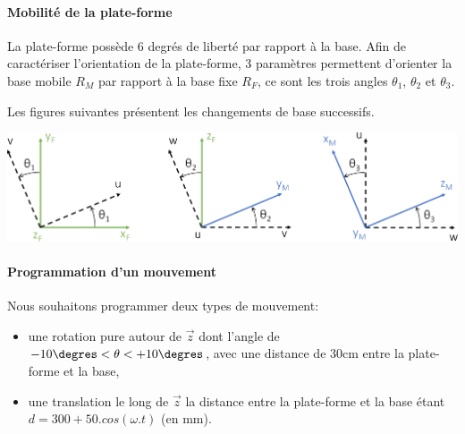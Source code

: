 
\paragraph{Mobilité de la plate-forme}

La plate-forme possède 6 degrés de liberté par rapport à la base. Afin de caractériser l'orientation de la plate-forme, 3 paramètres permettent d'orienter la base mobile $R_M$ par rapport à la base fixe $R_F$, ce sont les trois angles $\theta_1$, $\theta_2$ et $\theta_3$.

Les figures suivantes présentent les changements de base successifs.

\begin{center}
 \includegraphics[width=0.8\linewidth]{img/Stewart_euler}
\end{center}



\paragraph{Programmation d'un mouvement}

Nous souhaitons programmer deux types de mouvement:
\begin{itemize}
 \item une rotation pure autour de $\overrightarrow{z}$ dont l'angle de $-10\degres<\theta<+10\degres$, avec une distance de 30cm entre la plate-forme et la base,
 \item une translation le long de $\overrightarrow{z}$ la distance entre la plate-forme et la base étant $d=300+50.cos(\omega.t)$ (en mm).
\end{itemize}

